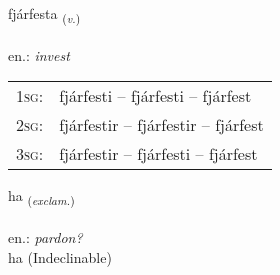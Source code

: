 \documentclass[frontgrid, backgrid]{flacards}\usepackage[]{graphicx}\usepackage[]{xcolor}
\begin{document}
\renewcommand{\flhead}{\vskip5pt \fboxsep=0pt {\small\bfseries\footnotesize Sagnorð | Verb}}
\renewcommand{\fcfoot}{\vskip5pt \fboxsep=0pt \hspace{2pt}{\small\bfseries\footnotesize 2K}}

\renewcommand{\blhead}{\vskip5pt {\small\bfseries\footnotesize Sagnorð | Verb }}
\renewcommand{\bcfoot}{\vskip5pt \hspace{2pt}{\small\bfseries\footnotesize 2K}}


{fjárfesta \small{\textsubscript{(\textit{v.})}} \\[1ex] %
 \\
en.: \emph{invest} \\  [2ex]
\renewcommand*{\arraystretch}{0.8}
\begin{tabular}{p{1cm}l}
\textsc{1sg}: & fjárfesti -- fjárfesti -- fjárfest \\ 
\textsc{2sg}: & fjárfestir -- fjárfestir -- fjárfest \\ 
\textsc{3sg}: & fjárfestir -- fjárfesti -- fjárfest \\ 
\end{tabular}
}


\renewcommand{\flhead}{\vskip5pt \fboxsep=0pt {\small\bfseries\footnotesize Upphrópanir | Exclamation}}
\renewcommand{\fcfoot}{\vskip5pt \fboxsep=0pt \hspace{2pt}{\small\bfseries\footnotesize 2K}}

\renewcommand{\blhead}{\vskip5pt {\small\bfseries\footnotesize Upphrópanir | Exclamation }}
\renewcommand{\bcfoot}{\vskip5pt \hspace{2pt}{\small\bfseries\footnotesize 2K}}


{ha \small{\textsubscript{(\textit{exclam.})}} \\[1ex]
\textphonetic{[haː]} \\
en.: \emph{pardon?} \\  [2ex]
ha (Indeclinable)}
\end{document}
